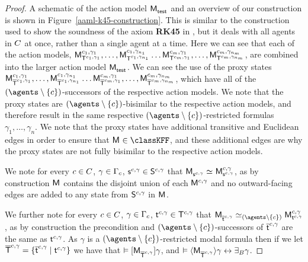 \begin{proof}
A schematic of the action model $\aPModel{\aStateTest}$ and an overview of our construction is shown in Figure~\ref{aaml-k45-construction}.
This is similar to the construction used to show the soundness of the axiom {\bf RK45} in \logicRmlKFF{}, but it deals with all agents in $\agentsC$ at once, rather than a single agent at a time.
Here we can see that each of the action models, $\aPModel[\agentC_1,\gamma_1]{\aStatesT[\agentC_1, \gamma_1]}, \dots, \aPModel[\agentC_1,\gamma_{n_1}]{\aStatesT[\agentC_1, \gamma_{n_1}]} \dots \aPModel[\agentC_m,\gamma_1]{\aStatesT[\agentC_m, \gamma_1]}, \dots, \aPModel[\agentC_m,\gamma_{n_m}]{\aStatesT[\agentC_m, \gamma_{n_m}]}$, are combined into the larger action model $\aPModel{\aStateTest}$.
We can see the use of the proxy states $\aPModel[\agentC_1,\gamma_1]{\aPStatesT[\agentC_1, \gamma_1]}, \dots, \aPModel[\agentC_1,\gamma_{n_1}]{\aPStatesT[\agentC_1, \gamma_{n_1}]} \dots \aPModel[\agentC_m,\gamma_1]{\aPStatesT[\agentC_m, \gamma_1]}, \dots, \aPModel[\agentC_m,\gamma_{n_m}]{\aPStatesT[\agentC_m, \gamma_{n_m}]}$, which have all of the $(\agents \setminus \{\agentC\})$-successors of the respective action models.
We note that the proxy states are $(\agents \setminus \{\agentC\})$-bisimilar to the respective action models, and therefore result in the same respective $(\agents \setminus \{\agentC\})$-restricted formulas $\gamma_1, \dots, \gamma_n$.
We note that the proxy states have additional transitive and Euclidean edges in order to ensure that $\aModel \in \classKFF$, and these additional edges are why the proxy states are not fully bisimilar to the respective action models.

We note for every $\agentC \in \agentsC$, $\gamma \in \Gamma_\agentC$, $\aStateS[\agentC, \gamma] \in \aStates[\agentC, \gamma]$ that $\aPModel{\aStateS[\agentC, \gamma]} \bisimilar \aPModel[\agentC, \gamma]{\aStateS[\agentC, \gamma]}$, as by construction $\aModel$ contains the disjoint union of each $\aModel[\agentC, \gamma]$ and no outward-facing edges are added to any state from $\aStates[\agentC, \gamma]$ in $\aModel$.

We further note for every $\agentC \in \agentsC$, $\gamma \in \Gamma_\agentC$, $\aStateT[\agentC, \gamma] \in \aStatesT[\agentC, \gamma]$ that $\aPModel{\aPStateT[\agentC, \gamma]} \bisimilar[(\agents \setminus \{\agentC\})] \aPModel[\agentC, \gamma]{\aStateT[\agentC, \gamma]}$, as by construction the precondition and $(\agents \setminus \{\agentC\})$-successors of $\aPStateT[\agentC, \gamma]$ are the same as $\aStateT[\agentC, \gamma]$.
As $\gamma$ is a $(\agents \setminus \{\agentC\})$-restricted modal formula then if we let $\aPStatesT[\agentC, \gamma] = \{\aPStateT[\agentC, \gamma] \mid \aStateT[\agentC, \gamma]\}$ we have that
$\entails \actionA{\aPModel{\aPStatesT[\agentC, \gamma]}} \gamma$, and
$\entails \actionE{\aPModel{\aPStatesT[\agentC, \gamma]}} \gamma \iff \someactsBs \gamma$.


\end{proof}
